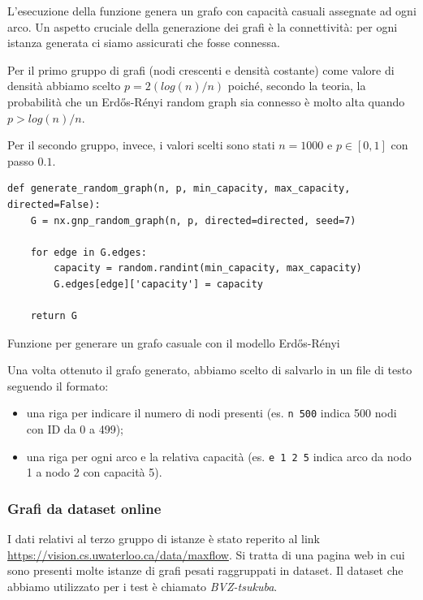                 L'esecuzione della funzione genera un grafo con capacità casuali assegnate ad ogni arco. Un aspetto cruciale della generazione dei grafi è la connettività: per ogni istanza generata ci siamo assicurati che fosse connessa.
                
                Per il primo gruppo di grafi (nodi crescenti e densità costante) come valore di densità abbiamo scelto $p = 2(log(n)/n)$ poiché, secondo la teoria, la probabilità che un Erdős-Rényi random graph sia connesso è molto alta quando $p > log(n)/n$.

                Per il secondo gruppo, invece, i valori scelti sono stati $n = 1000$ e $p \in [0,1]$ con passo $0.1$.

                \begin{listing}[ht]
                \begin{verbatim}
def generate_random_graph(n, p, min_capacity, max_capacity, directed=False):
    G = nx.gnp_random_graph(n, p, directed=directed, seed=7)

    for edge in G.edges:
        capacity = random.randint(min_capacity, max_capacity)
        G.edges[edge]['capacity'] = capacity
    
    return G
                \end{verbatim}
                \caption{Funzione per generare un grafo casuale con il modello Erdős-Rényi}\label{code:generate-random-graph}
                \end{listing}

                Una volta ottenuto il grafo generato, abbiamo scelto di salvarlo in un file di testo seguendo il formato:
                \begin{itemize}
                    \item una riga per indicare il numero di nodi presenti (es. \verb|n 500| indica 500 nodi con ID da 0 a 499);
                    \item una riga per ogni arco e la relativa capacità (es. \verb|e 1 2 5| indica arco da nodo 1 a nodo 2 con capacità 5).
                \end{itemize}
            

            \subsubsection*{Grafi da dataset online}

                I dati relativi al terzo gruppo di istanze è stato reperito al link \url{https://vision.cs.uwaterloo.ca/data/maxflow}. Si tratta di una pagina web in cui sono presenti molte istanze di grafi pesati raggruppati in dataset. Il dataset che abbiamo utilizzato per i test è chiamato \textit{BVZ-tsukuba}.

